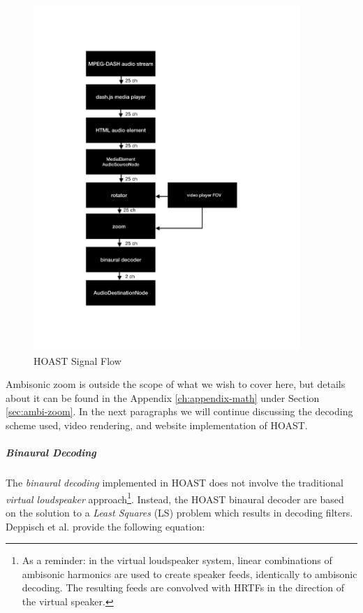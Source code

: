 \begin{figure}[ht!]%
\centering
\includegraphics[width=0.9\textwidth]{img/hoast-sig-flow.pdf} 
\caption{HOAST Signal Flow}
\label{fig:hoast-sig-flow}
\end{figure}

Ambisonic zoom is outside the scope of what we wish to cover here, but details about it can be found in the Appendix \ref{ch:appendix-math} under Section \ref{sec:ambi-zoom}. In the next paragraphs we will continue discussing the decoding scheme used, video rendering, and website implementation of HOAST.

\subparagraph{Binaural Decoding}

The \textit{binaural decoding} implemented in HOAST does not involve the traditional \textit{virtual loudspeaker} approach\footnote{As a reminder: in the virtual loudspeaker system, linear combinations of ambisonic harmonics are used to create speaker feeds, identically to ambisonic decoding. The resulting feeds are convolved with HRTFs in the direction of the virtual speaker.}. Instead, the HOAST binaural decoder are based on the solution to a \textit{Least Squares} (LS) problem which results in decoding filters. Deppisch et al. provide the following equation:


